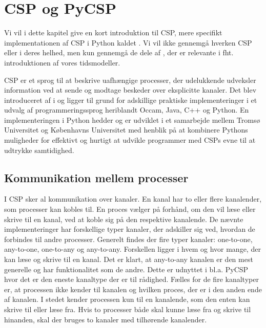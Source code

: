 \chapter{CSP og PyCSP}\label{chap:csp}


Vi vil i dette kapitel give en kort introduktion til CSP, mere specifikt implementationen af CSP i Python kaldet \pycsp. Vi vil ikke gennemgå hverken CSP eller \pycsp i deres helhed, men kun gennemgå de dele af \pycsp, der er relevante i fht. introduktionen af vores tidsmodeller. 

CSP er et sprog til at beskrive uafhængige processer, der udelukkende udveksler information ved at sende og modtage beskeder over eksplicitte kanaler. Det blev introduceret af \citeauthor{hoare-csp} i \cite{hoare-csp} og ligger til grund for adskillige praktiske implementeringer i et udvalg af programmeringssprog heriblandt Occam, Java, C++ og Python\cite{May1983, jcsp, Brown2007, pycsp}. En implementeringen i Python hedder \pycsp og er udviklet i et samarbejde mellem Tromsø Universitet og Københavns Universitet med henblik på at kombinere  Pythons muligheder  for effektivt og hurtigt at udvikle programmer med CSPs evne til at udtrykke samtidighed\cite{pycsp}. 

\section{Kommunikation mellem processer}
I CSP sker al kommunikation over kanaler. En kanal har to eller flere kanalender, som processer kan kobles til. En proces vælger på forhånd, om den vil læse eller skrive til en kanal, ved at koble sig på den respektive kanalende. De nævnte implementeringer har forskellige typer kanaler, der adskiller sig ved,  hvordan de forbindes til andre processer. Generelt findes der fire typer kanaler: one-to-one, any-to-one, one-to-any og any-to-any. Forskellen ligger i hvem og hvor mange, der kan læse og skrive til en kanal. Det er klart, at any-to-any kanalen er den mest generelle og har funktionalitet som de andre. Dette er udnyttet i bl.a. PyCSP hvor det er den eneste kanaltype der er til rådighed. Fælles for de fire kanaltyper er, at processen ikke kender til kanalen og hvilken proces, der er i den anden ende af kanalen. I stedet kender processen kun til en  kanalende, som  den enten kan skrive til eller læse fra. Hvis to processer både skal kunne læse fra og skrive til hinanden, skal der bruges to kanaler med tilhørende kanalender. 

